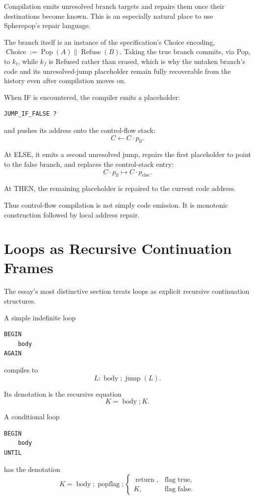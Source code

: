 \documentclass[12pt]{article}
\begin{document}
Compilation emits unresolved branch targets and repairs them once their destinations become known. This is an especially natural place to use Spherepop's repair language.

The branch itself is an instance of the specification's Choice encoding, \(\operatorname{Choice} := \operatorname{Pop}(A) \parallel \operatorname{Refuse}(B)\). Taking the true branch commits, via Pop, to \(k_t\), while \(k_f\) is Refused rather than erased, which is why the untaken branch's code and its unresolved-jump placeholder remain fully recoverable from the history even after compilation moves on.

When IF is encountered, the compiler emits a placeholder:
\begin{lstlisting}
JUMP_IF_FALSE ?
\end{lstlisting}
and pushes its address onto the control-flow stack:
\[
C\gets C\cdot p_{\mathrm{if}}.
\]

At ELSE, it emits a second unresolved jump, repairs the first placeholder to point to the false branch, and replaces the control-stack entry:
\[
C\cdot p_{\mathrm{if}} \mapsto C\cdot p_{\mathrm{else}}.
\]

At THEN, the remaining placeholder is repaired to the current code address.

Thus control-flow compilation is not simply code emission. It is monotonic construction followed by local address repair.

\section{Loops as Recursive Continuation Frames}

The essay's most distinctive section treats loops as explicit recursive continuation structures.

A simple indefinite loop
\begin{lstlisting}
BEGIN
    body
AGAIN
\end{lstlisting}
compiles to
\[
L: \operatorname{body}; \operatorname{jump}(L).
\]

Its denotation is the recursive equation
\[
K = \operatorname{body};K.
\]

A conditional loop
\begin{lstlisting}
BEGIN
    body
UNTIL
\end{lstlisting}
has the denotation
\[
K = \operatorname{body}; \operatorname{popflag};
\begin{cases}
\operatorname{return}, & \text{flag true},\\
K, & \text{flag false}.
\end{cases}
\]
\end{document}
